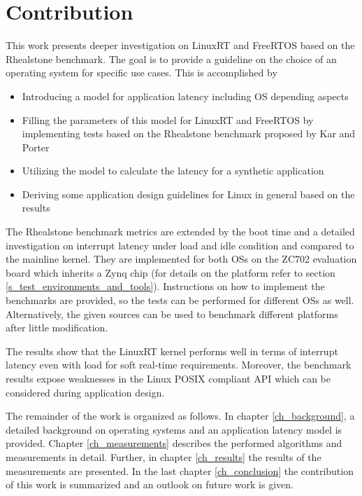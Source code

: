 \section{Contribution}
This work presents deeper investigation on LinuxRT and FreeRTOS based on the Rhealstone benchmark.
The goal is to provide a guideline on the choice of an operating system for specific use cases.
This is accomplished by
	\begin{itemize}
		\item Introducing a model for application latency including \ac{OS} depending aspects
		\item Filling the parameters of this model for LinuxRT and FreeRTOS by implementing tests based on the Rhealstone benchmark proposed by Kar and Porter \cite{kar:itrb} \cite{kar:artbp} 
		\item Utilizing the model to calculate the latency for a synthetic application 
		\item Deriving some application design guidelines for Linux in general based on the results
	\end{itemize} 
The Rhealstone benchmark metrics are extended by the boot time and a detailed investigation on interrupt latency under load and idle condition and compared to the mainline kernel.
They are implemented for both \acp{OS} on the ZC702 evaluation board which inherits a Zynq chip (for details on the platform refer to section \ref{s_test_environments_and_tools}). 
Instructions on how to implement the benchmarks are provided, so the tests can be performed for different \acp{OS} as well.
Alternatively, the given sources can be used to benchmark different platforms after little modification.
\par
The results show that the LinuxRT kernel performs well in terms of interrupt latency even with load for soft real-time requirements.
Moreover, the benchmark results expose weaknesses in the Linux POSIX compliant \ac{API} which can be considered during application design. 
\par
The remainder of the work is organized as follows. In chapter \ref{ch_background}, a detailed background on operating systems and an application latency model is provided. 
Chapter \ref{ch_measurements} describes the performed algorithms and measurements in detail. 
Further, in chapter \ref{ch_results} the results of the measurements are presented. 
In the last chapter \ref{ch_conclusion} the contribution of this work is summarized and an outlook on future work is given.